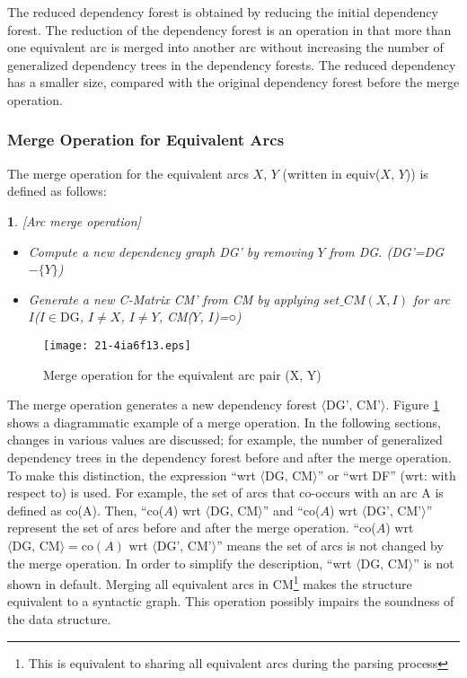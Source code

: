 \documentclass[english]{jnlp_1.4_rep}
\theoremstyle{break}
\theoremstyle{plain}
\theoremstyle{plain}
\newtheorem{definition}{}
\begin{document}
The reduced dependency forest is obtained by reducing the initial
dependency forest. The reduction of the dependency forest is an
operation in that more than one equivalent arc is merged into another arc
without increasing the number of generalized dependency trees in
the dependency forests. The reduced dependency has a smaller size,
compared with the original dependency forest before the merge
operation.


\subsubsection{Merge Operation for Equivalent Arcs}

The merge operation for the equivalent arcs $X$, $Y$ (written in
equiv($X$, $Y$)) is defined as follows:

\begin{definition}\label{def:ArcMrgOpe}[Arc merge operation]

\begin{itemize}
\item[(1)] Compute a new dependency graph DG' by removing $Y$ from DG. (DG'=DG$-\{Y\}$)
\item[(2)] Generate a new C-Matrix CM' from CM by applying $set\_CM(X, I)$ for arc $I$($I \in \mathrm{DG}$, $I \neq X$, $I \neq Y$, CM($Y$, $I$)=○)
\end{itemize}
\end{definition}

\begin{figure}[b]
 \begin{center}
\texttt{[image: 21-4ia6f13.eps]}
 \end{center}
\caption{Merge operation for the equivalent arc pair (X, Y)}
\label{fig:ArcMerge}
\end{figure}

The merge operation generates a new dependency forest $\langle \text{DG', CM'}\rangle$. 
Figure \ref{fig:ArcMerge} shows a diagrammatic example of a merge
operation. In the following sections, changes in various values are
discussed; for example, the number of generalized dependency trees in
the dependency forest before and after the merge operation. To make
this distinction, the expression ``wrt $\langle \text{DG, CM}\rangle $'' or ``wrt DF''
(wrt: with respect to) is used. For example, the set of arcs that
co-occurs with an arc A is defined as co(A). Then, ``co($A$) wrt
$\langle \text{DG, CM}\rangle$'' and ``co($A$) wrt $\langle \text{DG', CM'}\rangle$'' represent the set of
arcs before and after the merge operation. ``co($A$) wrt $\langle \text{DG, CM}\rangle 
= \mathrm{co}(A)$ wrt $\langle \text{DG', CM'}\rangle$'' means the set of arcs is not changed by
the merge operation. In order to simplify the description, ``wrt
$\langle \text{DG, CM}\rangle$'' is not shown in default. Merging all equivalent arcs
in CM\footnote{This is equivalent to sharing all equivalent arcs
  during the parsing process} makes the structure equivalent to a
syntactic graph. This operation possibly impairs the soundness of the
data structure.
\end{document}
